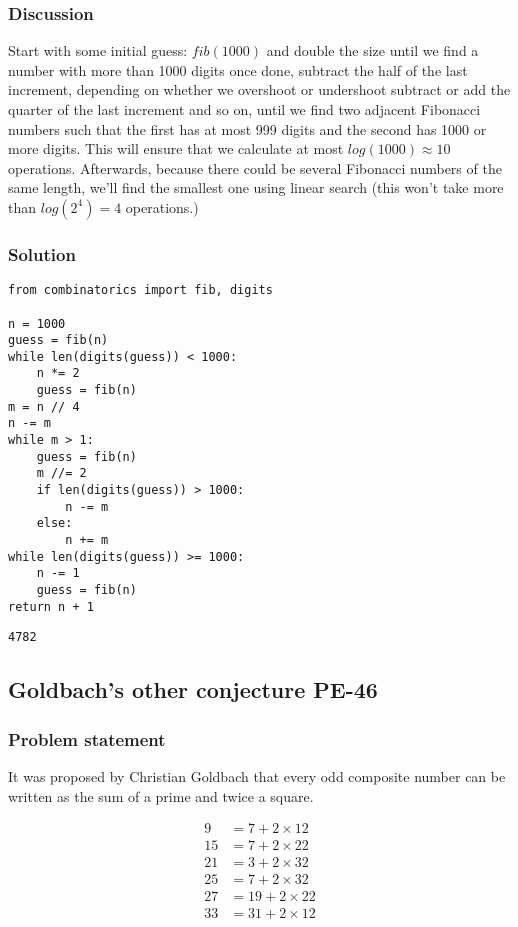 \documentclass[11pt]{article}
\begin{document}
\subsubsection{Discussion}
\label{sec:orgheadline3}
Start with some initial guess: \(fib(1000)\) and double the size until we find
a number with more than 1000 digits once done, subtract the half of the last
increment, depending on whether we overshoot or undershoot subtract or add
the quarter of the last increment and so on, until we find two adjacent
Fibonacci numbers such that the first has at most 999 digits and the second
has 1000 or more digits.  This will ensure that we calculate at most
\(log(1000) \approx 10\) operations.  Afterwards, because there could be
several Fibonacci numbers of the same length, we'll find the smallest one
using linear search (this won't take more than \(log(2^4) = 4\) operations.)

\subsubsection{Solution}
\label{sec:orgheadline4}

\begin{verbatim}
from combinatorics import fib, digits

n = 1000
guess = fib(n)
while len(digits(guess)) < 1000:
    n *= 2
    guess = fib(n)
m = n // 4
n -= m
while m > 1:
    guess = fib(n)
    m //= 2
    if len(digits(guess)) > 1000:
        n -= m
    else:
        n += m
while len(digits(guess)) >= 1000:
    n -= 1
    guess = fib(n)
return n + 1
\end{verbatim}

\begin{verbatim}
4782
\end{verbatim}

\subsection{Goldbach's other conjecture PE-46}
\label{sec:orgheadline9}
\subsubsection{Problem statement}
\label{sec:orgheadline6}
It was proposed by Christian Goldbach that every odd composite number can be
written as the sum of a prime and twice a square.

\begin{align*}
  9  &= 7  + 2 \times 12 \\
  15 &= 7  + 2 \times 22 \\
  21 &= 3  + 2 \times 32 \\
  25 &= 7  + 2 \times 32 \\
  27 &= 19 + 2 \times 22 \\
  33 &= 31 + 2 \times 12
\end{align*}
\end{document}
